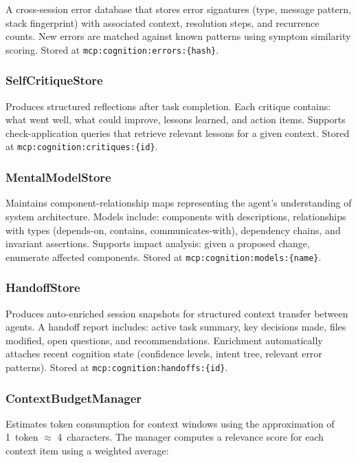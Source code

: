 \documentclass[journal,10pt]{IEEEtran}
\newcommand{\code}[1]{\texttt{#1}}
\begin{document}
A cross-session error database that stores error signatures (type, message pattern, stack fingerprint) with associated context, resolution steps, and recurrence counts. New errors are matched against known patterns using symptom similarity scoring. Stored at \code{mcp:cognition:errors:\{hash\}}.

\subsubsection{SelfCritiqueStore}

Produces structured reflections after task completion. Each critique contains: what went well, what could improve, lessons learned, and action items. Supports check-application queries that retrieve relevant lessons for a given context. Stored at \code{mcp:cognition:critiques:\{id\}}.

\subsubsection{MentalModelStore}

Maintains component-relationship maps representing the agent's understanding of system architecture. Models include: components with descriptions, relationships with types (depends-on, contains, communicates-with), dependency chains, and invariant assertions. Supports impact analysis: given a proposed change, enumerate affected components. Stored at \code{mcp:cognition:models:\{name\}}.

\subsubsection{HandoffStore}

Produces auto-enriched session snapshots for structured context transfer between agents. A handoff report includes: active task summary, key decisions made, files modified, open questions, and recommendations. Enrichment automatically attaches recent cognition state (confidence levels, intent tree, relevant error patterns). Stored at \code{mcp:cognition:handoffs:\{id\}}.

\subsubsection{ContextBudgetManager}

Estimates token consumption for context windows using the approximation of 1~token $\approx$ 4~characters. The manager computes a relevance score for each context item using a weighted average:
\end{document}
